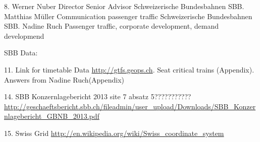 \documentclass[11pt]{article}
\begin{document}
8. Werner Nuber\newline
Director Senior Advisor\newline
Schweizerische Bundesbahnen SBB. Matthias Müller\newline
Communication passenger traffic\newline
Schweizerische Bundesbahnen SBB. Nadine Ruch\newline
Passenger traffic, corporate development,
demand developmend \newline

SBB Data:\newline

11. Link for timetable Data \url{http://gtfs.geops.ch}. Seat critical trains (Appendix). Answers from Nadine Ruch(Appendix)\newline

14. SBB Konzernlagebericht 2013 site 7 absatz 5???????????\url{http://geschaeftsbericht.sbb.ch/fileadmin/user_upload/Downloads/SBB_Konzernlagebericht_GBNB_2013.pdf}\newline

15. Swiss Grid \url{http://en.wikipedia.org/wiki/Swiss_coordinate_system}

\appendix
\end{document}
